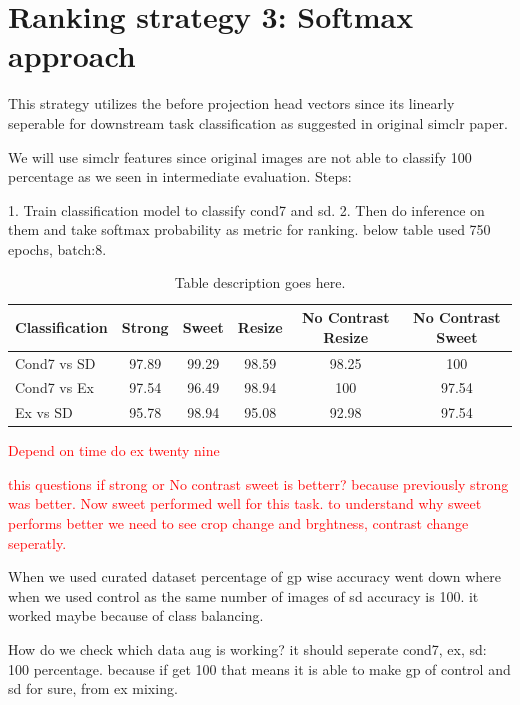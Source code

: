 \section{Ranking strategy 3: Softmax approach}

This strategy utilizes the before projection head vectors since its linearly seperable for downstream task classification as suggested in original simclr paper.

We will use simclr features since original images are not able to classify 100 percentage as we seen in intermediate evaluation.
Steps:

1. Train classification model to classify cond7 and sd. 
2. Then do inference on them and take softmax probability as metric for ranking.
below table used 750 epochs, batch:8.
\begin{table}[H]
  \centering
  \begin{tabular}{@{}lccccc@{}}
  \toprule
  \textbf{Classification} & \textbf{Strong} & \textbf{Sweet} & \textbf{Resize} & \textbf{No Contrast Resize} & \textbf{No Contrast Sweet} \\ \midrule
  Cond7 vs SD             & 97.89           & 99.29          & 98.59           & 98.25                       & 100                        \\
  Cond7 vs Ex             & 97.54               & 96.49              & 98.94               & 100                           &   97.54                        \\
  Ex vs SD             & 95.78               & 98.94              & 95.08               & 92.98                           & 97.54                         \\ \bottomrule
  \end{tabular}
  \caption{Table description goes here.}
  \label{tab:ranking softmax}
\end{table}

\textcolor{red}{Depend on time do ex twenty nine}
  
\textcolor{red}{this questions if strong or No contrast sweet is betterr? because previously strong was better. Now sweet performed well for this task. 
to understand why sweet performs better we need to see crop change and brghtness, contrast change seperatly.}

When we used curated dataset percentage of gp wise accuracy went down where when we used control as the same number of images of sd accuracy is 100. 
it worked maybe because of class balancing.

How do we check which data aug is working?
it should seperate cond7, ex, sd: 100 percentage. because if get 100 that means it is able to make gp of control and sd for sure, from ex mixing.

